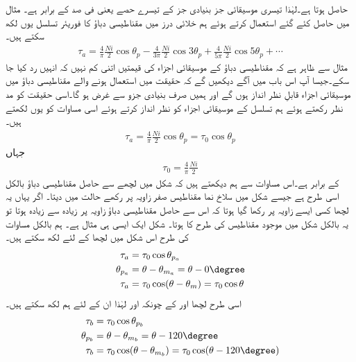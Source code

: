 حاصل ہوتا ہے۔لہٰذا تیسری موسیقائی جز بنیادی جز کے تیسرے حصے یعنی  فی صد کے برابر ہے۔
%
مثال  میں حاصل کئے گئے  استعمال کرتے ہوئے  ہم خلائی درز میں مقناطیسی دباؤ  کا فوریئر تسلسل یوں لکھ سکتے ہیں۔
\begin{align}\label{مساوات_تبادلہ_توانائی_فوریئر_متقناطیسی_دباؤ_تسلسل}
\tau_a=\frac{4}{\pi}\frac{Ni}{2} \cos \theta_p-\frac{4}{3\pi}\frac{Ni}{2} \cos 3\theta_p+\frac{4}{5\pi}\frac{Ni}{2} \cos 5\theta_p+\cdots
\end{align}
مثال  سے ظاہر ہے کہ مقناطیسی دباؤ کے موسیقائی اجزاء  کی قیمتیں اتنی کم نہیں کہ انہیں رد کیا جا سکے۔جیسا آپ اس باب میں آگے دیکھیں گے کہ حقیقت میں استعمال ہونے والے  مقناطیسی دباؤ میں موسیقائی اجزاء قابلِ نظر انداز ہوں گے اور ہمیں صرف بنیادی جزو  سے غرض ہو گا۔اسی حقیقت کو مد نظر رکھتے ہوئے ہم  تسلسل کے موسیقائی اجزاء کو نظر انداز کرتے ہوئے اسی مساوات کو یوں لکھتے ہیں۔ 
\begin{align}
\tau_{a}=\frac{4}{\pi}\frac{Ni}{2} \cos \theta_p=\tau_0 \cos \theta_p
\end{align}
جہاں
\begin{align}
\tau_0=\frac{4}{\pi}\frac{Ni}{2} 
\end{align}
کے برابر ہے۔اس مساوات سے ہم دیکھتے ہیں کہ شکل   میں لچھے سے حاصل مقناطیسی دباؤ بالکل اسی طرح ہے جیسے شکل   میں سلاخ نما مقناطیس صفر زاویہ پر رکھے حالت میں دیتا۔ اگر یہاں یہ لچھا کسی ایسے زاویہ پر رکھا گیا ہوتا کہ اس سے حاصل مقناطیسی دباؤ زاویہ   پر زیادہ سے زیادہ ہوتا تو یہ بالکل شکل   میں موجود مقناطیس کی طرح کا ہوتا۔ شکل   ایک ایسی ہی مثال ہے۔ ہم بالکل مساوات   کی طرح اس شکل میں لچھا   کے لئے لکھ سکتے ہیں۔
\begin{gather}
\begin{aligned}
\tau_a&=\tau_0 \cos \theta_{p_a}\\
\theta_{p_a}&=\theta-\theta_{m_a}=\theta-0\degree\\
\tau_a&=\tau_0 \cos (\theta-\theta_m)=\tau_0 \cos \theta
\end{aligned}
\end{gather}
اسی طرح لچھا  اور  کے  چونکہ  اور   لہٰذا ان کے لئے ہم لکھ سکتے ہیں۔
\begin{gather}
\begin{aligned}
\tau_b&=\tau_0 \cos \theta_{p_b}\\
\theta_{p_b}&=\theta-\theta_{m_b}=\theta-120\degree\\
\tau_b&=\tau_0 \cos (\theta-\theta_{m_b})=\tau_0 \cos (\theta-120\degree)
\end{aligned}
\end{gather}
